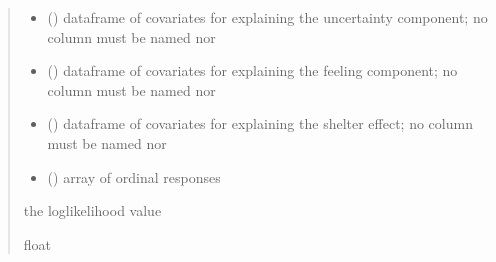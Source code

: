 \documentclass[letterpaper,10pt,english]{sphinxmanual}
\begin{document}
\begin{fulllineitems}
\begin{quote}
\begin{description}
\begin{itemize}
\item {} 
\sphinxAtStartPar
{} () \textendash{} dataframe of covariates for explaining the uncertainty component;
no column must be named  nor 

\item {} 
\sphinxAtStartPar
{} () \textendash{} dataframe of covariates for explaining the feeling component;
no column must be named  nor 

\item {} 
\sphinxAtStartPar
{} () \textendash{} dataframe of covariates for explaining the shelter effect;
no column must be named  nor 

\item {} 
\sphinxAtStartPar
{} () \textendash{} array of ordinal responses

\end{itemize}

\sphinxAtStartPar
the log\sphinxhyphen{}likelihood value

\sphinxAtStartPar
float

\end{description}\end{quote}

\end{fulllineitems}

\end{document}
